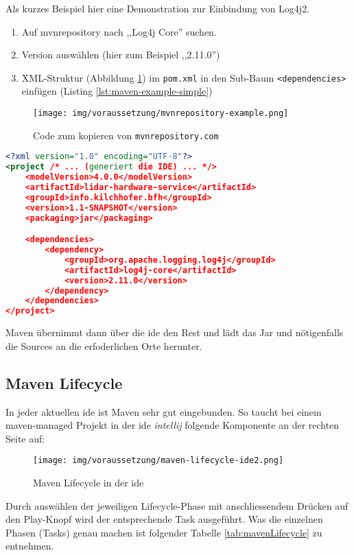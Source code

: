 Als kurzes Beispiel hier eine Demonstration zur Einbindung von Log4j2.
\begin{enumerate}
	\item Auf mvnrepository nach ,,Log4j Core'' suchen.
	\item Version auswählen (hier zum Beispiel ,,2.11.0'')
	\item XML-Struktur (Abbildung \ref{fig:mvnrepository-example}) im \texttt{pom.xml} in den Sub-Baum \texttt{<dependencies>} einfügen (Listing \ref{lst:maven-example-simple})
\end{enumerate}


\begin{figure}[H]
	\centering
	\texttt{[image: img/voraussetzung/mvnrepository-example.png]}
	\caption{Code zum kopieren von \texttt{mvnrepository.com}}
	\label{fig:mvnrepository-example}
\end{figure}

\begin{lstlisting}[language=XML, caption={Simples Beispiel wie ein pom.xml aussieht},label={lst:maven-example-simple}]
<?xml version="1.0" encoding="UTF-8"?>
<project /* ... (generiert die IDE) ... */>
	<modelVersion>4.0.0</modelVersion>
	<artifactId>lidar-hardware-service</artifactId>
	<groupId>info.kilchhofer.bfh</groupId>
	<version>1.1-SNAPSHOT</version>
	<packaging>jar</packaging>

	<dependencies>
		<dependency>
			<groupId>org.apache.logging.log4j</groupId>
			<artifactId>log4j-core</artifactId>
			<version>2.11.0</version>
		</dependency>
	</dependencies>
</project>
\end{lstlisting}
Maven übernimmt dann über die \acrshort{ide} den Rest und lädt das Jar und nötigenfalls die Sources an die erfoderlichen Orte herunter.
\subsection{Maven Lifecycle}
In jeder aktuellen \acrshort{ide} ist Maven sehr gut eingebunden. So taucht bei einem maven-managed Projekt in der \acrshort{ide} \textit{\Gls{intellij}} folgende Komponente an der rechten Seite auf:
\begin{figure}[H]
	\centering
	\texttt{[image: img/voraussetzung/maven-lifecycle-ide2.png]}
	\caption{Maven Lifecycle in der \acrshort{ide}}
	\label{fig:maven-ide}
\end{figure}
Durch auswählen der jeweiligen Lifecycle-Phase mit anschliessendem Drücken auf den Play-Knopf wird der entsprechende Task ausgeführt. Was die einzelnen Phasen (Tasks) genau machen ist folgender Tabelle \ref{tab:mavenLifecycle} zu entnehmen.

